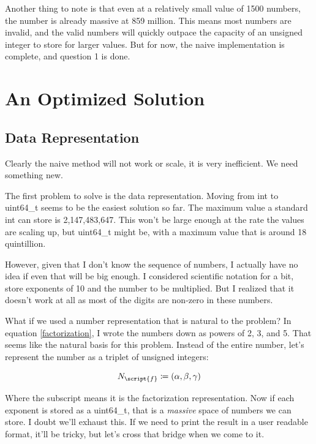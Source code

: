 \documentclass{article}
\begin{document}
Another thing to note is that even at a relatively small value of 1500 numbers, the number is already massive at 859 million. This means most numbers are invalid, and the valid numbers will quickly outpace the capacity of an unsigned integer to store for larger values. But for now, the naive implementation is complete, and question 1 is done.

\newpage

\section{An Optimized Solution}

\subsection{Data Representation}

Clearly the naive method will not work or scale, it is very inefficient. We need something new. \newline

The first problem to solve is the data representation. Moving from int to uint64\_t seems to be the easiest solution so far. The maximum value a standard int can store is 2,147,483,647. This won't be large enough at the rate the values are scaling up, but uint64\_t might be, with a maximum value that is around 18 quintillion. \newline

However, given that I don't know the sequence of numbers, I actually have no idea if even that will be big enough. I considered scientific notation for a bit, store exponents of 10 and the number to be multiplied. But I realized that it doesn't work at all as most of the digits are non-zero in these numbers. \newline

What if we used a number representation that is natural to the problem? In equation \ref{factorization}, I wrote the numbers down as powers of 2, 3, and 5. That seems like the natural basis for this problem. Instead of the entire number, let's represent the number as a triplet of unsigned integers:

\begin{equation}
    N_{\script{f}} \coloneq (\alpha, \beta, \gamma)
\end{equation}

Where the subscript means it is the factorization representation. Now if each exponent is stored as a uint64\_t, that is a \textit{massive} space of numbers we can store. I doubt we'll exhaust this. If we need to print the result in a user readable format, it'll be tricky, but let's cross that bridge when we come to it.
\end{document}
